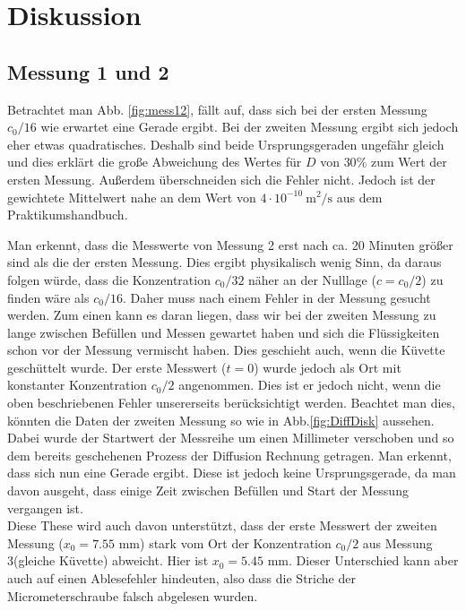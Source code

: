 \documentclass[12pt,a4paper,titlepage,headinclude,bibtotoc]{scrartcl}
\begin{document}
\section{Diskussion}
\label{sec:diskussion}
\subsection{Messung 1 und 2}
Betrachtet man Abb. \ref{fig:mess12}, fällt auf, dass sich bei der ersten Messung $c_0/16$ wie erwartet eine Gerade ergibt. Bei der zweiten Messung ergibt sich jedoch eher etwas quadratisches.
Deshalb sind beide Ursprungsgeraden ungefähr gleich und dies erklärt die große Abweichung des Wertes für $D$ von $30\%$ zum Wert der ersten Messung.
Außerdem überschneiden sich die Fehler nicht.
Jedoch ist der gewichtete Mittelwert nahe an dem Wert von $4\cdot 10^{-10}~\si{\meter^2/\second}$ aus dem Praktikumshandbuch.

Man erkennt, dass die Messwerte von Messung 2  erst nach ca. 20 Minuten größer sind als die der ersten Messung.
Dies ergibt physikalisch wenig Sinn, da daraus folgen würde, dass die Konzentration $c_0/32$ näher an der Nulllage ($c=c_0/2$) zu finden wäre als $c_0/16$. 
Daher muss nach einem Fehler in der Messung gesucht werden.
Zum einen kann es daran liegen, dass wir bei der zweiten Messung zu lange zwischen Befüllen und Messen gewartet haben und sich die Flüssigkeiten schon vor der Messung vermischt haben.
Dies geschieht auch, wenn die Küvette geschüttelt wurde.
Der erste Messwert ($t=0$) wurde jedoch als Ort mit konstanter Konzentration $c_0/2$ angenommen.
Dies ist er jedoch nicht, wenn die oben beschriebenen Fehler unsererseits berücksichtigt werden.
Beachtet man dies, könnten die Daten der zweiten Messung so wie in Abb.\ref{fig:DiffDisk} aussehen.
Dabei wurde der Startwert der Messreihe um einen Millimeter verschoben und so dem bereits geschehenen Prozess der Diffusion Rechnung getragen.
Man erkennt, dass sich nun eine Gerade ergibt. Diese ist jedoch keine Ursprungsgerade, da man davon ausgeht, dass einige Zeit zwischen Befüllen und Start der Messung vergangen ist.\\
Diese These wird auch davon unterstützt, dass der erste Messwert der zweiten Messung ($x_0=7.55$ mm) stark vom Ort der Konzentration $c_0/2$ aus Messung 3(gleiche Küvette) abweicht.
Hier ist $x_0=5.45$ mm.
Dieser Unterschied kann aber auch auf einen Ablesefehler hindeuten, 
also dass die Striche der Micrometerschraube falsch abgelesen wurden.
\end{document}
